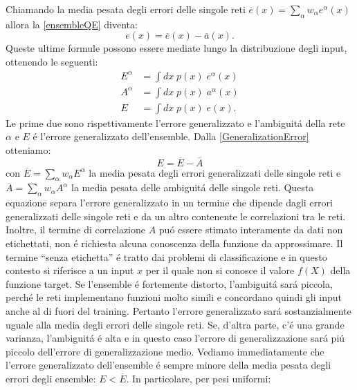 \documentclass[a4paper,10pt]{article}
\begin{document}
  Chiamando la media pesata degli errori delle singole reti $\overline{e}\left(x\right) = \sum_{\alpha} w_{\alpha} e^{\alpha}\left(x\right)$ allora la \ref{ensembleQE} diventa:
  \begin{equation}
   e\left(x\right) = \overline{e}\left(x\right) - \overline{a}\left(x\right). \label{GeneralizationError}
  \end{equation}
  Queste ultime formule possono essere mediate lungo la distribuzione degli input, ottenendo le seguenti:
  \begin{align}
   E^{\alpha} &= \int dx \; p\left(x\right) \; e^{\alpha}\left(x\right) \\
   A^{\alpha} &= \int dx \; p\left(x\right) \; a^{\alpha}\left(x\right) \\
   E &= \int dx \; p\left(x\right) \; e\left(x\right).
  \end{align}
  Le prime due sono rispettivamente l'errore generalizzato e l'ambiguit\'a della rete $\alpha$ e $E$ \'e l'errore generalizzato dell'ensemble. Dalla \ref{GeneralizationError} otteniamo:
  \begin{equation}
   E = \overline{E} - \overline{A} \label{EnsembleGeneralizationError}
  \end{equation}
  con $\overline{E} = \sum_{\alpha} w_{\alpha} E^{\alpha}$ la media pesata degli errori generalizzati delle singole reti e $\overline{A} = \sum_{\alpha} w_{\alpha} A^{\alpha}$ la media pesata delle ambiguit\'a delle singole reti.
  Questa equazione separa l'errore generalizzato in un termine che dipende dagli errori generalizzati delle singole reti e da un altro contenente le correlazioni tra le reti. Inoltre, il termine di correlazione $A$ pu\'o essere stimato interamente da dati non etichettati, non \'e richiesta alcuna conoscenza della funzione da approssimare. Il termine ``senza etichetta'' \'e tratto dai problemi di classificazione e in questo contesto si riferisce a un input $x$ per il quale non si conosce il valore $f(X)$ della funzione target. 
  Se l'ensemble \'e fortemente distorto, l'ambiguit\'a sar\'a piccola, perch\'e le reti implementano funzioni molto simili e concordano quindi gli input anche al di fuori del training. Pertanto l'errore generalizzato sar\'a sostanzialmente uguale alla media degli errori delle singole reti. Se, d'altra parte, c'\'e una grande varianza, l'ambiguit\'a \'e alta e in questo caso l'errore di generalizzazione sar\'a pi\'u piccolo dell'errore di generalizzazione medio.
  Vediamo immediatamente che l'errore generalizzato dell'ensemble \'e sempre minore della media pesata degli errori degli ensemble: $E < \overline{E}$. In particolare, per pesi uniformi:
\end{document}
